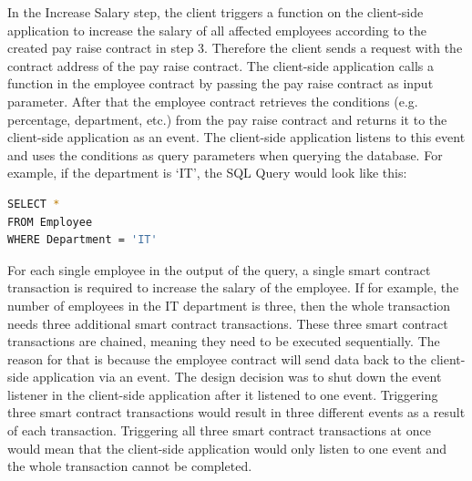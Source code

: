 In the Increase Salary step, the client triggers a function on the client-side application to increase the salary of all affected employees according to the created pay raise contract in step 3. Therefore the client sends a request with the contract address of the pay raise contract. The client-side application calls a function in the employee contract by passing the pay raise contract as input parameter. After that the employee contract retrieves the conditions (e.g. percentage, department, etc.) from the pay raise contract and returns it to the client-side application as an event. The client-side application listens to this event and uses the conditions as query parameters when querying the database. For example, if the department is ‘IT’, the SQL Query would look like this:

\begin{lstlisting}[language=bash]
SELECT *
FROM Employee
WHERE Department = 'IT'
\end{lstlisting}

For each single employee in the output of the query, a single smart contract transaction is required to increase the salary of the employee. If for example, the number of employees in the IT department is three, then the whole transaction needs three additional smart contract transactions. These three smart contract transactions are chained, meaning they need to be executed sequentially. The reason for that is because the employee contract will send data back to the client-side application via an event. The design decision was to shut down the event listener in the client-side application after it listened to one event. Triggering three smart contract transactions would result in three different events as a result of each transaction. Triggering all three smart contract transactions at once would mean that the client-side application would only listen to one event and the whole transaction cannot be completed.

